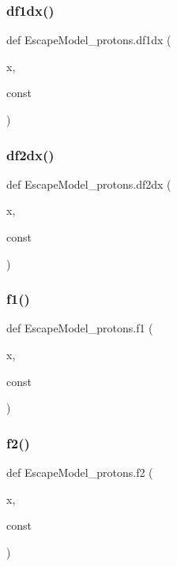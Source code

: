 \subsubsection{\texorpdfstring{df1dx()}{df1dx()}}
{\footnotesize\ttfamily def Escape\+Model\+\_\+protons.\+df1dx (\begin{DoxyParamCaption}\item[{}]{x,  }\item[{}]{const }\end{DoxyParamCaption})}

\mbox{\label{namespaceEscapeModel__protons_a0a75b47afc7659e399bcf3d41964eeff}} 
\subsubsection{\texorpdfstring{df2dx()}{df2dx()}}
{\footnotesize\ttfamily def Escape\+Model\+\_\+protons.\+df2dx (\begin{DoxyParamCaption}\item[{}]{x,  }\item[{}]{const }\end{DoxyParamCaption})}

\mbox{\label{namespaceEscapeModel__protons_a367f4fac56e6bb2634ff81b75189ffe1}} 
\subsubsection{\texorpdfstring{f1()}{f1()}}
{\footnotesize\ttfamily def Escape\+Model\+\_\+protons.\+f1 (\begin{DoxyParamCaption}\item[{}]{x,  }\item[{}]{const }\end{DoxyParamCaption})}

\mbox{\label{namespaceEscapeModel__protons_af1dd1fd70516e62cfdc4758783a6ff22}} 
\subsubsection{\texorpdfstring{f2()}{f2()}}
{\footnotesize\ttfamily def Escape\+Model\+\_\+protons.\+f2 (\begin{DoxyParamCaption}\item[{}]{x,  }\item[{}]{const }\end{DoxyParamCaption})}

